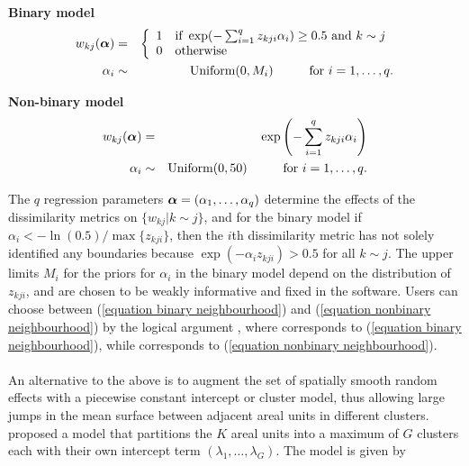 \documentclass[article,shortnames,nojss]{jss}
\newcommand{\bd}[1]{\ensuremath{\mbox{\boldmath $#1$}}}
\begin{document}
\textbf{Binary model}
\begin{eqnarray}
w_{kj}(\bd{\alpha})&=&\left\{ \begin{array}{ll}
1&\mbox{if }\exp(-\sum_{i=1}^{q}z_{kji}\alpha_{i})\geq0.5 \mbox{ and } k\sim j\\
0&\mbox{otherwise}\\\end{array}\right.\label{equation binary neighbourhood}\\
\alpha_{i}&\sim&\mbox{Uniform}(0, M_{i})\hspace{1cm}\mbox{for $i=1,\ldots,q$.}\nonumber
\end{eqnarray}

\textbf{Non-binary model}
\begin{eqnarray}
w_{kj}(\bd{\alpha})&=&\exp\left(-\sum_{i=1}^{q}z_{kji}\alpha_{i}\right)\label{equation nonbinary neighbourhood}\\
\alpha_{i}&\sim&\mbox{Uniform}(0, 50)\hspace{1cm}\mbox{for $i=1,\ldots,q$.}\nonumber
\end{eqnarray}

The $q$ regression parameters $\bd{\alpha}=(\alpha_{1},\ldots,\alpha_{q})$ determine the effects of the dissimilarity metrics on $\{w_{kj}|k\sim j\}$, and for the binary model if $\alpha_i<-\ln(0.5)/\max\{z_{kji}\}$, then the $i$th dissimilarity metric has not solely identified any  boundaries because $\exp(-\alpha_i z_{kji})>0.5$ for all $k\sim j$. The upper limits $M_{i}$ for the priors for $\alpha_i$ in the binary model depend on the distribution of $z_{kji}$, and are chosen to be weakly informative and fixed in the software. Users can choose between (\ref{equation binary neighbourhood}) and (\ref{equation nonbinary neighbourhood}) by the logical argument , where  corresponds to (\ref{equation binary neighbourhood}), while  corresponds to (\ref{equation nonbinary neighbourhood}).\\


\\
An alternative to the above is to augment the set of spatially smooth random effects with a piecewise constant intercept or cluster model, thus allowing large jumps in the mean surface between adjacent areal units in different clusters. \cite{lee2015} proposed a model that partitions the $K$ areal units into a maximum of $G$ clusters each with their own intercept term $(\lambda_{1},\ldots,\lambda_{G})$. The  model is given by
\end{document}
